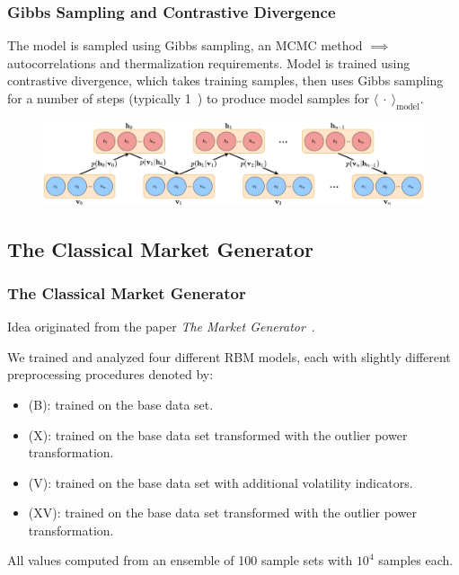 \documentclass{beamer}
\begin{document}
\begin{frame}
    \frametitle{Gibbs Sampling and Contrastive Divergence}
    The model is sampled using Gibbs sampling, an MCMC method \( \implies \) autocorrelations and thermalization requirements.
    Model is trained using contrastive divergence, which takes training samples, then uses Gibbs sampling for a number of steps (typically 1~\cite{hinton_rbm_training}) to produce model samples for \( \langle \ \cdot \ \rangle_\text{model} \).
    \begin{figure}
        \includegraphics[width=1\linewidth]{gibbs_sampling_diagram.png}
    \end{figure}
\end{frame}

\subsection{The Classical Market Generator}
\begin{frame}
    \frametitle{The Classical Market Generator}
    Idea originated from the paper \textit{The Market Generator}~\cite{kondratyev_2019}.

    We trained and analyzed four different RBM models, each with slightly different preprocessing procedures denoted by:
    \begin{itemize}
        \item (B): trained on the base data set.
        \item (X): trained on the base data set transformed with the outlier power transformation.
        \item (V): trained on the base data set with additional volatility indicators.
        \item (XV): trained on the base data set transformed with the outlier power transformation.
    \end{itemize}
    All values computed from an ensemble of 100 sample sets with \( 10^4 \) samples each.
\end{frame}

\end{document}
